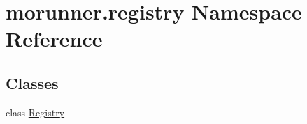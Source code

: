 \hypertarget{namespacemorunner_1_1registry}{}\section{morunner.\+registry Namespace Reference}
\label{namespacemorunner_1_1registry}
\subsection*{Classes}
\begin{DoxyCompactItemize}
\item 
class \hyperlink{classmorunner_1_1registry_1_1Registry}{Registry}
\end{DoxyCompactItemize}
